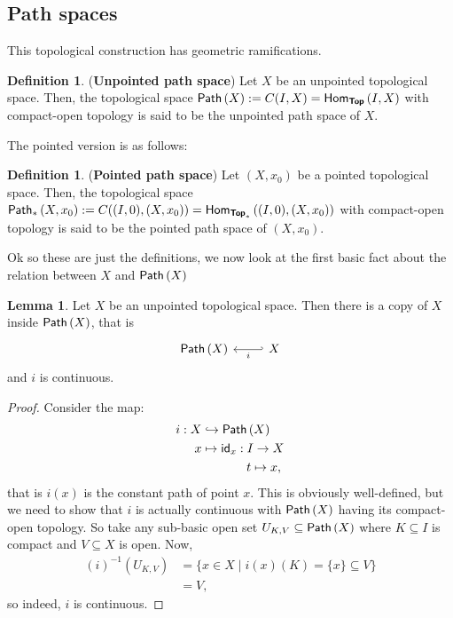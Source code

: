\documentclass[letterpaper,11pt,twoside]{article}
\theoremstyle{definition}
\theoremstyle{definition}
\newtheorem{definition}[proposition]{Definition}
\theoremstyle{definition}
\theoremstyle{definition}
\newtheorem{lemma}[proposition]{\textbf{Lemma}}
\theoremstyle{definition}
\theoremstyle{definition}
\theoremstyle{remark}
\theoremstyle{definition}
\newcommand{\cat}[1]{{\fontfamily{lmss}\selectfont 
		\text{\textbf{#1}}
}}
\newcommand{\homset}[3]{{\fontfamily{lmss}\selectfont 
		\text{Hom}_{#1}\left (#2,#3\right )
}}
\newcommand{\id}[1]{{\fontfamily{lmss}\selectfont 
		\text{id}_{#1}
}}
\newcommand{\inv}[1]{\left(#1\right)^{-1}}
\newcommand{\upps}[1]{{\fontfamily{lmss}\selectfont 
		\text{Path}\left(#1\right)
}}
\newcommand{\pps}[1]{{\fontfamily{lmss}\selectfont 
		\text{Path}_{*}\left(#1\right)
}}
\begin{document}
    \subsection{Path spaces}
    This topological construction has geometric ramifications.
    \begin{definition}
    (\textbf{Unpointed path space}) Let $X$ be an unpointed topological space. Then, the topological space $\upps{X} := C(I,X) = \homset{\cat{Top}}{I}{X}$ with compact-open topology is said to be the unpointed path space of $X$.
    \end{definition}
    The pointed version is as follows:
    \begin{definition}
    (\textbf{Pointed path space}) Let $(X,x_0)$ be a pointed topological space. Then, the topological space $\pps{X,x_0}:= C((I,0), (X,x_0)) = \homset{\cat{Top}_*}{(I,0)}{(X,x_0)}$ with compact-open topology is said to be the pointed path space of $(X,x_0)$. 
    \end{definition}
    Ok so these are just the definitions, we now look at the first basic fact about the relation between $X$ and $\upps{X}$
    \begin{lemma}\label{L-2.2.3}
    Let $X$ be an unpointed topological space. Then there is a copy of $X$ inside $\upps{X}$, that is
\[\begin{tikzcd}
	{\upps{X}} & X
	\arrow["i", hook', from=1-2, to=1-1]
\end{tikzcd}\]
and $i$ is continuous.
    \end{lemma}
    \begin{proof}
        Consider the map:
        \begin{align*}
            i : X&\hookrightarrow \upps{X}\\
            x&\mapsto \id{x} : I \to X\\
            &\;\;\;\;\;\;\;\;\;\;\;\;\;t\mapsto x,
        \end{align*}
        that is $i(x)$ is the constant path of point $x$. This is obviously well-defined, but we need to show that $i$ is actually continuous with $\upps{X}$ having its compact-open topology. So take any sub-basic open set $U_{K,V} \subseteq \upps{X}$ where $K\subseteq I$ is compact and $V\subseteq X$ is open. Now, 
        \begin{align*}
            \inv{i}\left(U_{K,V}\right)&=\{x\in X\;\vert\; i(x)(K)=\{x\} \subseteq V\}\\
            &= V,
        \end{align*}
        so indeed, $i$ is continuous.
    \end{proof}
\end{document}
